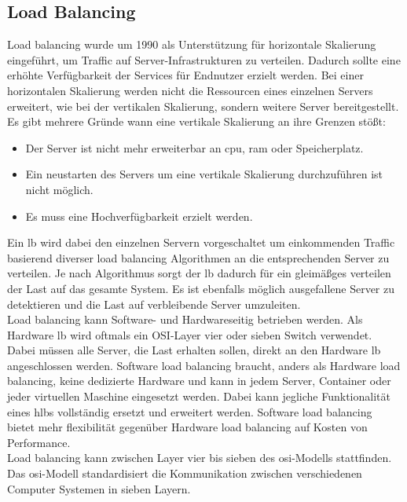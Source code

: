 \subsection{Load Balancing} \label{s:load-balancing}
Load balancing wurde um 1990 als Unterstützung für horizontale Skalierung eingeführt, um Traffic auf Server-Infrastrukturen zu verteilen. Dadurch sollte eine erhöhte Verfügbarkeit der Services für Endnutzer erzielt werden.
\cite{LoadBalancing101}
Bei einer horizontalen Skalierung werden nicht die Ressourcen eines einzelnen Servers erweitert, wie bei der vertikalen Skalierung, sondern weitere Server bereitgestellt. Es gibt mehrere Gründe wann eine vertikale Skalierung an ihre Grenzen stö{\ss}t:
\begin{itemize}
    \item Der Server ist nicht mehr erweiterbar an \acs{cpu}, \acs{ram} oder Speicherplatz.
    \item Ein neustarten des Servers um eine vertikale Skalierung durchzuführen ist nicht möglich.
    \item Es muss eine Hochverfügbarkeit erzielt werden.
\end{itemize}
\cite{bourkeServerLoadBalancing2001}
Ein \acl{lb} wird dabei den einzelnen Servern vorgeschaltet um einkommenden Traffic basierend diverser load balancing Algorithmen an die entsprechenden Server zu verteilen.
Je nach Algorithmus sorgt der \ac{lb} dadurch für ein gleimä{\ss}ges verteilen der Last auf das gesamte System. Es ist ebenfalls möglich ausgefallene Server zu detektieren und die Last auf verbleibende Server umzuleiten.
\\
Load balancing kann Software- und Hardwareseitig betrieben werden. Als Hardware \ac{lb} wird oftmals ein OSI-Layer vier oder sieben Switch verwendet. Dabei müssen alle Server, die Last erhalten sollen, direkt an den Hardware \ac{lb} angeschlossen werden.
\cite{WasIstLoad2016}
Software load balancing braucht, anders als Hardware load balancing, keine dedizierte Hardware und kann in jedem Server, Container oder jeder virtuellen Maschine eingesetzt werden.
\cite{SoftwareLoadBalancing}
Dabei kann jegliche Funktionalität eines \acp{hlb} vollständig ersetzt und erweitert werden. Software load balancing bietet mehr flexibilität gegenüber Hardware load balancing auf Kosten von Performance.
\cite{WhatLoadBalancer}
\\
Load balancing kann zwischen Layer vier bis sieben des \ac{osi}-Modells stattfinden.
\cite{WhatLoadBalancer}
Das \ac{osi}-Modell standardisiert die Kommunikation zwischen verschiedenen Computer Systemen in sieben Layern.
